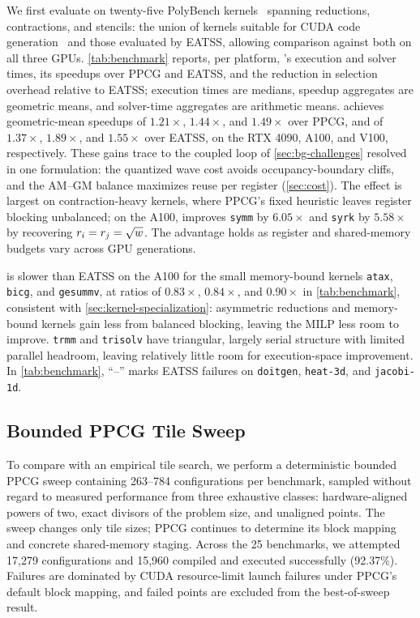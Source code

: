 We first evaluate \name on twenty-five PolyBench kernels~\cite{polybench} spanning reductions, contractions, and stencils: the union of kernels suitable for CUDA code generation~\cite{ppcg} and those evaluated by EATSS, allowing comparison against both on all three GPUs. \autoref{tab:benchmark} reports, per platform, \name's execution and solver times, its speedups over PPCG and EATSS, and the reduction in selection overhead relative to EATSS; execution times are medians, speedup aggregates are geometric means, and solver-time aggregates are arithmetic means. \name achieves geometric-mean speedups of $1.21\times$, $1.44\times$, and $1.49\times$ over PPCG, and of $1.37\times$, $1.89\times$, and $1.55\times$ over EATSS, on the RTX 4090, A100, and V100, respectively. These gains trace to the coupled loop of \autoref{sec:bg-challenges} resolved in one formulation: the quantized wave cost avoids occupancy-boundary cliffs, and the AM--GM balance maximizes reuse per register (\autoref{sec:cost}). The effect is largest on contraction-heavy kernels, where PPCG's fixed heuristic leaves register blocking unbalanced; on the A100, \name improves \texttt{symm} by $6.05\times$ and \texttt{syrk} by $5.58\times$ by recovering \(r_i=r_j=\sqrt{w}\). The advantage holds as register and shared-memory budgets vary across GPU generations.

\name is slower than EATSS on the A100 for the small memory-bound kernels \texttt{atax}, \texttt{bicg}, and \texttt{gesummv}, at ratios of \(0.83\times\), \(0.84\times\), and \(0.90\times\) in \autoref{tab:benchmark}, consistent with \autoref{sec:kernel-specialization}: asymmetric reductions and memory-bound kernels gain less from balanced blocking, leaving the MILP less room to improve. \texttt{trmm} and \texttt{trisolv} have triangular, largely serial structure with limited parallel headroom, leaving relatively little room for execution-space improvement. In \autoref{tab:benchmark}, ``--'' marks EATSS failures on \texttt{doitgen}, \texttt{heat-3d}, and \texttt{jacobi-1d}.

\subsection{Bounded PPCG Tile Sweep}
\label{subsec:bounded-ppcg-sweep}

To compare \name with an empirical tile search, we perform a deterministic bounded PPCG sweep containing 263--784 configurations per benchmark, sampled without regard to measured performance from three exhaustive classes: hardware-aligned powers of two, exact divisors of the problem size, and unaligned points. The sweep changes only tile sizes; PPCG continues to determine its block mapping and concrete shared-memory staging. Across the 25 benchmarks, we attempted 17,279 configurations and 15,960 compiled and executed successfully (92.37\%). Failures are dominated by CUDA resource-limit launch failures under PPCG's default block mapping, and failed points are excluded from the best-of-sweep result.

